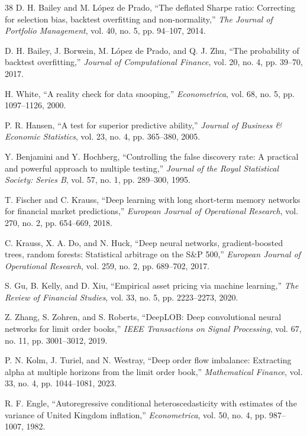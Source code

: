 \documentclass[conference]{IEEEtran}
\begin{document}
\begin{thebibliography}{38}
 D. H. Bailey and M. L\'opez de Prado, ``The deflated Sharpe
ratio: Correcting for selection bias, backtest overfitting and non-normality,''
\emph{The Journal of Portfolio Management}, vol. 40, no. 5, pp. 94--107, 2014.

 D. H. Bailey, J. Borwein, M. L\'opez de Prado, and
Q. J. Zhu, ``The probability of backtest overfitting,'' \emph{Journal of
Computational Finance}, vol. 20, no. 4, pp. 39--70, 2017.

 H. White, ``A reality check for data snooping,''
\emph{Econometrica}, vol. 68, no. 5, pp. 1097--1126, 2000.

 P. R. Hansen, ``A test for superior predictive ability,''
\emph{Journal of Business \& Economic Statistics}, vol. 23, no. 4,
pp. 365--380, 2005.

 Y. Benjamini and Y. Hochberg, ``Controlling the false discovery
rate: A practical and powerful approach to multiple testing,'' \emph{Journal of
the Royal Statistical Society: Series B}, vol. 57, no. 1, pp. 289--300, 1995.

 T. Fischer and C. Krauss, ``Deep learning with long
short-term memory networks for financial market predictions,'' \emph{European
Journal of Operational Research}, vol. 270, no. 2, pp. 654--669, 2018.

 C. Krauss, X. A. Do, and N. Huck, ``Deep neural networks,
gradient-boosted trees, random forests: Statistical arbitrage on the
S\&P 500,'' \emph{European Journal of Operational Research}, vol. 259, no. 2,
pp. 689--702, 2017.

 S. Gu, B. Kelly, and D. Xiu, ``Empirical asset pricing via
machine learning,'' \emph{The Review of Financial Studies}, vol. 33, no. 5,
pp. 2223--2273, 2020.

 Z. Zhang, S. Zohren, and S. Roberts, ``DeepLOB: Deep
convolutional neural networks for limit order books,'' \emph{IEEE Transactions
on Signal Processing}, vol. 67, no. 11, pp. 3001--3012, 2019.

 P. N. Kolm, J. Turiel, and N. Westray, ``Deep order flow
imbalance: Extracting alpha at multiple horizons from the limit order book,''
\emph{Mathematical Finance}, vol. 33, no. 4, pp. 1044--1081, 2023.

 R. F. Engle, ``Autoregressive conditional
heteroscedasticity with estimates of the variance of United Kingdom
inflation,'' \emph{Econometrica}, vol. 50, no. 4, pp. 987--1007, 1982.


\end{thebibliography}
\end{document}
